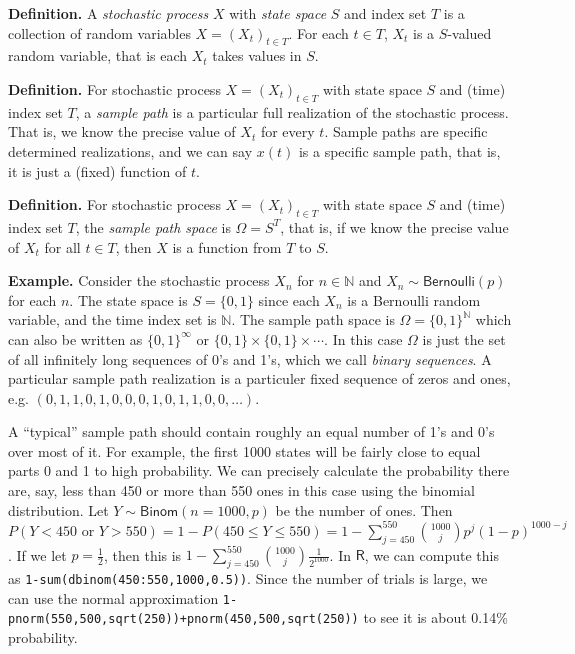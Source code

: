 \documentclass[
]{article}
\begin{document}
\textbf{Definition.} A \emph{stochastic process} \(X\) with \emph{state space} \(S\) and
index set \(T\) is a collection of random variables \(X=(X_t)_{t\in T}\).
For each \(t\in T\), \(X_t\) is a \(S\)-valued random variable, that is each
\(X_t\) takes values in \(S\).

\textbf{Definition.} For stochastic process \(X=(X_t)_{t\in T}\) with state
space \(S\) and (time) index set \(T\), a \emph{sample path} is a particular full
realization of the stochastic process. That is, we know the precise
value of \(X_t\) for every \(t\). Sample paths are specific determined
realizations, and we can say \(x(t)\) is a specific sample path, that is,
it is just a (fixed) function of \(t\).

\textbf{Definition.} For stochastic process \(X=(X_t)_{t\in T}\) with state
space \(S\) and (time) index set \(T\), the \emph{sample path space} is
\(\Omega=S^T\), that is, if we know the precise value of \(X_t\) for all
\(t\in T\), then \(X\) is a function from \(T\) to \(S\).

\textbf{Example.} Consider the stochastic process \(X_n\) for \(n\in\mathbb N\)
and \(X_n\sim\textsf{Bernoulli}(p)\) for each \(n\). The state space is
\(S=\{0,1\}\) since each \(X_n\) is a Bernoulli random variable, and the
time index set is \(\mathbb N\). The sample path space is
\(\Omega=\{0,1\}^{\mathbb N}\) which can also be written as
\(\{0,1\}^\infty\) or \(\{0,1\}\times\{0,1\}\times\cdots\). In this case
\(\Omega\) is just the set of all infinitely long sequences of 0's and
1's, which we call \emph{binary sequences}. A particular sample path
realization is a particuler fixed sequence of zeros and ones, e.g.
\((0,1,1,0,1,0,0,0,1,0,1,1,0,0,\ldots)\).

A ``typical'' sample path should contain roughly an equal number of 1's
and 0's over most of it. For example, the first 1000 states will be
fairly close to equal parts 0 and 1 to high probability. We can
precisely calculate the probability there are, say, less than 450 or
more than 550 ones in this case using the binomial distribution. Let
\(Y\sim\textsf{Binom}(n=1000,p)\) be the number of ones. Then
\(P(Y<450\text{ or }Y>550)=1-P(450\leq Y\leq 550)=1-\sum_{j=450}^{550}{1000\choose j}p^j(1-p)^{1000-j}\).
If we let \(p=\frac12\), then this is
\(1-\sum_{j=450}^{550}{1000\choose j}\frac1{2^{1000}}\). In \(\textsf{R}\), we can
compute this as \texttt{1-sum(dbinom(450:550,1000,0.5))}. Since the number of
trials is large, we can use the normal approximation
\texttt{1-pnorm(550,500,sqrt(250))+pnorm(450,500,sqrt(250))} to see it is about
0.14\% probability.
\end{document}
